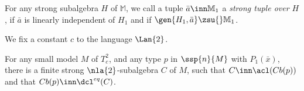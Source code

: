 \documentclass[11pt,english]{article}
\begin{document}
\title{}
\author{}
\date{}
\maketitle
For any strong subalgebra $H$ of $\mathbb{M}$, we call a tuple $\bar a\inn\mathbb{M}_{1}$ a {\em strong tuple over $H$},
if $\bar a$ is linearly independent of $H_{1}$ and if $\gen{H_{1},\bar a}\zsu{}\mathbb{M}_{1}$.
\begin{teo}\label{teowei}
We fix a constant $c$ to the language $\Lan{2}$.

For any small model $M$ of $T^{2}_{c}$, and any type $p$ in $\ssp{n}{M}$ with $P_{1}(\bar x)$,
there is a finite strong $\nla{2}$-subalgebra $C$ of $M$,
such that
$C\inn\acl(Cb(p))$ and that $Cb(p)\inn\dcl^{eq}(C)$.
\end{teo}
\end{document}
